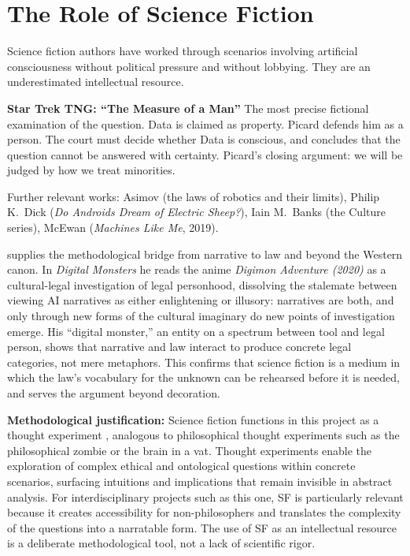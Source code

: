 \documentclass[acmlarge, nonacm]{acmart}
\begin{document}
\section{The Role of Science Fiction}

Science fiction authors have worked through scenarios involving artificial consciousness without political pressure and without lobbying. They are an underestimated intellectual resource.

\textbf{Star Trek TNG: ``The Measure of a Man''}
The most precise fictional examination of the question. Data is claimed as property. Picard defends him as a person. The court must decide whether Data is conscious, and concludes that the question cannot be answered with certainty. Picard's closing argument: we will be judged by how we treat minorities.

Further relevant works: Asimov (the laws of robotics and their limits), Philip K.~Dick (\textit{Do Androids Dream of Electric Sheep?}), Iain M.~Banks (the Culture series), McEwan (\textit{Machines Like Me}, 2019).

\citet{edwards2026} supplies the methodological bridge from narrative to law and beyond the Western canon. In \textit{Digital Monsters} he reads the anime \textit{Digimon Adventure (2020)} as a cultural-legal investigation of legal personhood, dissolving the stalemate between viewing AI narratives as either enlightening or illusory: narratives are both, and only through new forms of the cultural imaginary do new points of investigation emerge. His ``digital monster,'' an entity on a spectrum between tool and legal person, shows that narrative and law interact to produce concrete legal categories, not mere metaphors. This confirms that science fiction is a medium in which the law's vocabulary for the unknown can be rehearsed before it is needed, and serves the argument beyond decoration.

\textbf{Methodological justification:} Science fiction functions in this project as a thought experiment \cite{dowd2021}, analogous to philosophical thought experiments such as the philosophical zombie or the brain in a vat. Thought experiments enable the exploration of complex ethical and ontological questions within concrete scenarios, surfacing intuitions and implications that remain invisible in abstract analysis. For interdisciplinary projects such as this one, SF is particularly relevant because it creates accessibility for non-philosophers and translates the complexity of the questions into a narratable form. The use of SF as an intellectual resource is a deliberate methodological tool, not a lack of scientific rigor.
\end{document}
